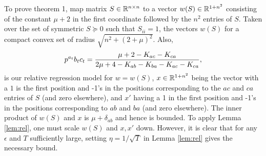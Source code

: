 \documentclass{article}
\begin{document}
To prove theorem 1, map matrix $S\in \reals^{n \times n}$ to a vector $w(S)\in\reals^{1+n^2}$ consisting of the constant $\mu+2$ in the first coordinate followed by the $n^2$ entries of $S$.  Taken over the set of symmetric $S \succeq 0$ such that $S_{ii}=1$, the vectors $w(S)$ for a compact convex set of radius $\sqrt{n^2+(2+\mu)^2}$.  Also,
$$p^{a_t}{b_tc_t}=\frac{\mu + 2-\S_{ac}-\S_{ca}}{2\mu + 4-\S_{ab}-\S_{ba}-\S_{ac}-\S_{ca}},$$
is our relative regression model for $w=w(S)$, $x\in\reals^{1+n^2}$ being the vector with a $1$ is the first position and -1's in the positions corresponding to the $ac$ and $ca$ entries of $S$ (and zero elsewhere), and $x'$ having a 1 in the first position and -1's in the positions corresponding to $ab$ and $ba$ (and zero elsewhere).  The inner product of $w(S)$ and $x$ is $\mu+\delta_{ab}$ and hence is bounded.  
To apply Lemma \ref{lem:rel}, one must scale $w(S)$ and $x,x'$ down.  However, it is clear that for any $\epsilon$ and $T$ sufficiently large, setting $\eta=1/\sqrt{T}$ in Lemma \ref{lem:rel} gives the necessary bound.






\end{document}
